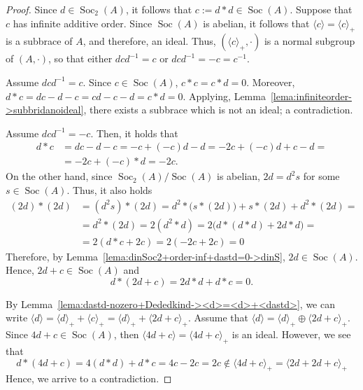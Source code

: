 \documentclass[10pt,a4paper]{amsart}
\DeclareMathOperator{\Soc}{Soc}
\begin{document}
\begin{proof}
Since $d \in \Soc_2(A)$, it follows that $c:= d \ast d \in \Soc(A)$. Suppose that $c$ has infinite additive order. %
Since $\Soc(A)$ is abelian, it follows that $\langle c \rangle = \langle c \rangle_+$ is a subbrace of $A$, and therefore, an ideal. Thus, $(\langle c \rangle_+,\cdot)$ is a normal subgroup of $(A, \cdot)$, so that either $dcd^{-1} = c$ or $dcd^{-1} = -c = c^{-1}$.

Assume $dcd^{-1} = c$. Since $c\in \Soc(A)$, $c \ast c = c \ast d = 0$. Moreover, $d \ast c = dc -d -c = cd -c - d = c\ast d = 0$. Applying, Lemma~\ref{lema:infiniteorder->subbridanoideal}, there exists a subbrace which is not an ideal; a contradiction.

Assume $dcd^{-1} = -c$. Then, it holds that 
\begin{align*}
d \ast c & = dc -d - c = -c + (-c)d -d  = -2c + (-c)d + c - d =\\
& = -2c + (-c)\ast d = -2c.
\end{align*}
On the other hand, since $\Soc_2(A)/\Soc(A)$ is abelian, $2d = d^2s$ for some $s \in \Soc(A)$. Thus, it also holds
\begin{align*}
(2d) \ast (2d) & = (d^2s) \ast (2d) = d^2 \ast \big(s \ast (2d)\big) + s \ast (2d) + d^2 \ast (2d) = \\
& =  d^2 \ast (2d) = 2(d^2 \ast d) = 2\big(d \ast (d \ast d) + 2d \ast d\big) = \\
& = 2(d \ast c + 2c) = 2(-2c + 2c) = 0
\end{align*}
Therefore, by Lemma~\ref{lema:dinSoc2+order-inf+dastd=0->dinS}, $2d\in \Soc(A)$. Hence, $2d + c \in \Soc(A)$ and 
\[ d \ast (2d + c) = 2d \ast d + d \ast c = 0.\]

By Lemma~\ref{lema:dastd-nozero+Dededkind-><d>=<d>+<dastd>}, we can write $\langle d \rangle = \langle d \rangle_+ + \langle c \rangle_+ = \langle d \rangle_+ + \langle 2d + c \rangle_+$. Assume that $\langle d \rangle = \langle d \rangle_+ \oplus \langle 2d + c\rangle_+$. Since $4d+c\in \Soc(A)$, then $\langle 4d +c \rangle = \langle 4d+c \rangle_+$ is an ideal. However, we see that
\[ d \ast (4d + c) = 4(d \ast d) + d \ast c = 4c - 2c = 2c \notin \langle 4d + c \rangle_+ = \langle 2d + 2d+c\rangle_+\]
Hence, we arrive to a contradiction.


\end{proof}
\end{document}
